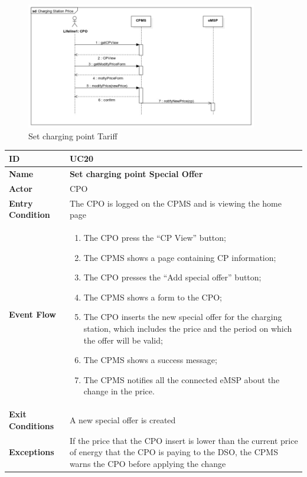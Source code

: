 \documentclass{Configuration_Files/PoliMi3i_thesis}
\begin{document}
\begin{figure}[H]
    \centering
    \includegraphics[width=0.9\textwidth]{Images/UseCases/SetChargingPointTariff.jpg}
    \caption{Set charging point Tariff}
\end{figure}


\begin{table}[H]
    \begin{xltabular}{\textwidth}{| >{}l | X |}
    \hline
    \textbf{ID} & \textbf{UC20}\T\B\\
    \hline
    \textbf{Name} & \textbf{Set charging point Special Offer}\T\B\\
    \hline \hline
    \textbf{Actor} & CPO\T\B \\
    \hline
    \textbf{Entry Condition} & The CPO is logged on the CPMS and is viewing the home page\T\B\\
    \hline
    \textbf{Event Flow} & 
        \begin{enumerate}
        \item The CPO press the “CP View” button;
        \item The CPMS shows a page containing CP information;
        \item The CPO presses the “Add special offer” button;
        \item The CPMS shows a form to the CPO;
        \item The CPO inserts the new special offer for the charging station, which includes the price and the period on which the offer will be valid;
        \item The CPMS shows a success message;
        \item The CPMS notifies all the connected eMSP about the change in the price.
        \end{enumerate}\B\\
    \hline
    \textbf{Exit Conditions} & A new special offer is created\B\\
    \hline
    \textbf{Exceptions} & If the price that the CPO insert is lower than the current price of energy that the CPO is paying to the DSO, the CPMS warns the CPO before applying the change\B\\
    \hline
    \end{xltabular}
\end{table}
\end{document}
